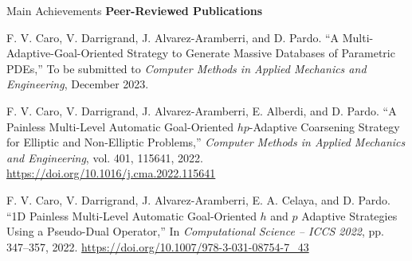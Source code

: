 \begin{frame}{Main Achievements}
\textbf{Peer-Reviewed Publications}
\begin{thebibliography}{2}
{\small F. V. Caro, V. Darrigrand, J. Alvarez-Aramberri, and D. Pardo. ``A Multi-Adaptive-Goal-Oriented Strategy to Generate Massive Databases of Parametric PDEs,'' To be submitted to \textit{Computer Methods in Applied Mechanics and Engineering}, December 2023.}

{\small F. V. Caro, V. Darrigrand, J. Alvarez-Aramberri, E. Alberdi, and D. Pardo. ``A Painless Multi-Level Automatic Goal-Oriented $hp$-Adaptive Coarsening Strategy for Elliptic and Non-Elliptic Problems,'' \textit{Computer Methods in Applied Mechanics and Engineering}, vol. 401, 115641, 2022. \url{https://doi.org/10.1016/j.cma.2022.115641}}

{\small F. V. Caro, V. Darrigrand, J. Alvarez-Aramberri, E. A. Celaya, and D. Pardo. ``1D Painless Multi-Level Automatic Goal-Oriented $h$ and $p$ Adaptive Strategies Using a Pseudo-Dual Operator,'' In \textit{Computational Science -- ICCS 2022}, pp. 347--357, 2022. \url{https://doi.org/10.1007/978-3-031-08754-7_43}}
\end{thebibliography}
\end{frame}

